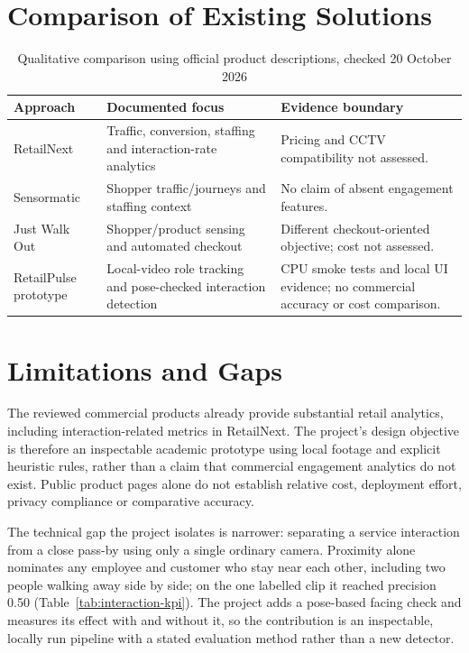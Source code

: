 \section{Comparison of Existing Solutions}
\begin{table}[H]
\centering
\caption{Qualitative comparison using official product descriptions, checked 20 October 2026}
\begin{tabular}{P{0.21\textwidth}P{0.40\textwidth}P{0.29\textwidth}}
\toprule
Approach & Documented focus & Evidence boundary\\
\midrule
RetailNext & Traffic, conversion, staffing and interaction-rate analytics \cite{retailnextTraffic} & Pricing and CCTV compatibility not assessed.\\
Sensormatic & Shopper traffic/journeys and staffing context \cite{sensormaticInsights} & No claim of absent engagement features.\\
Just Walk Out & Shopper/product sensing and automated checkout \cite{amazonJwo} & Different checkout-oriented objective; cost not assessed.\\
RetailPulse prototype & Local-video role tracking and pose-checked interaction detection & CPU smoke tests and local UI evidence; no commercial accuracy or cost comparison.\\
\bottomrule
\end{tabular}
\end{table}

\section{Limitations and Gaps}
The reviewed commercial products already provide substantial retail analytics, including interaction-related metrics in RetailNext. The project's design objective is therefore an inspectable academic prototype using local footage and explicit heuristic rules, rather than a claim that commercial engagement analytics do not exist. Public product pages alone do not establish relative cost, deployment effort, privacy compliance or comparative accuracy.

The technical gap the project isolates is narrower: separating a service interaction from a close pass-by using only a single ordinary camera. Proximity alone nominates any employee and customer who stay near each other, including two people walking away side by side; on the one labelled clip it reached precision 0.50 (Table~\ref{tab:interaction-kpi}). The project adds a pose-based facing check and measures its effect with and without it, so the contribution is an inspectable, locally run pipeline with a stated evaluation method rather than a new detector.

